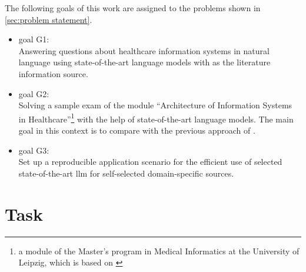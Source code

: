 The following goals of this work are assigned to the problems shown in \cref{sec:problem statement}.
\begin{itemize}
  \item goal G1:\\
    Answering questions about healthcare information systems in natural language using state-of-the-art language models with \citet{bb2} as the literature information source. 
  \item goal G2:\\
   Solving a sample exam of the module \enquote{Architecture of Information Systems in Healthcare}\footnote{\raggedright{}a module of the Master's program in Medical Informatics at the University of Leipzig, which is based on \citet{bb2}} with the help of state-of-the-art language models.
   The main goal in this context is to compare with the previous approach of \citet{Paul_Keller} .
   \item goal G3:\\
   Set up a reproducible application scenario for the efficient use of selected state-of-the-art \ac{llm} for self-selected domain-specific sources.
\end{itemize}

\section{Task}

